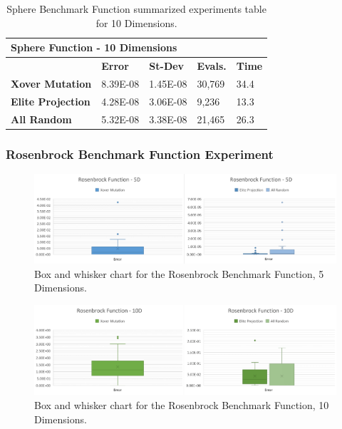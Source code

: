\documentclass[graybox]{svmult}
\begin{document}
\begin{table}[]
    \scriptsize
    \centering
    \caption{Sphere Benchmark Function summarized experiments table for 10 Dimensions.}\label{tab.fun_sphere10}
    \begin{tabular}{@{}lllll@{}}
    \toprule
    \multicolumn{5}{l}{\textbf{Sphere Function - 10 Dimensions}} \\ \midrule
     & \textbf{Error} & \textbf{St-Dev} & \textbf{Evals.} & \textbf{Time} \\
    \textbf{Xover Mutation} & 8.39E-08 & 1.45E-08 & 30,769 & 34.4 \\
    \textbf{Elite Projection} & 4.28E-08 & 3.06E-08 & 9,236 & 13.3 \\
    \textbf{All Random} & 5.32E-08 & 3.38E-08 & 21,465 & 26.3 \\ \bottomrule
    \end{tabular}
    \end{table}


\subsubsection{Rosenbrock Benchmark Function Experiment}

    \begin{figure}
        \includegraphics[width=\linewidth, frame]{img/fig_fun_rosenbrock_5d.pdf}
        \caption{Box and whisker chart for the Rosenbrock Benchmark Function, 5 Dimensions.} \label{fig.fun_rosenbrock_5d}
        \end{figure}

    \begin{figure}
        \includegraphics[width=\linewidth, frame]{img/fig_fun_rosenbrock_10d.pdf}
        \caption{Box and whisker chart for the Rosenbrock Benchmark Function, 10 Dimensions.} \label{fig.fun_rosenbrock_10d}
        \end{figure}
\end{document}
